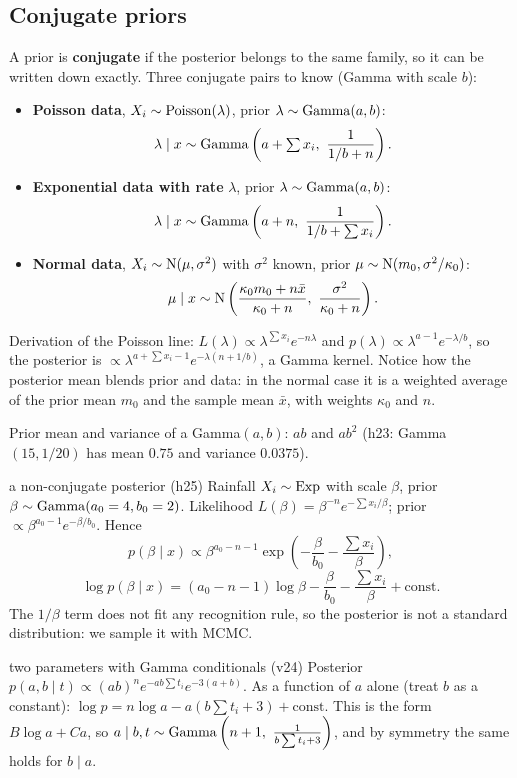 \subsection{Conjugate priors}
A prior is \textbf{conjugate} if the posterior belongs to the same family, so it can be written down exactly.
Three conjugate pairs to know (Gamma with scale $b$):
\begin{itemize}
  \item \textbf{Poisson data}, $X_i\sim\mathrm{Poisson}(\lambda)$, prior $\lambda\sim\mathrm{Gamma}(a,b)$:
  \[ \lambda\mid x\sim\Gam\left(a+\textstyle\sum x_i,\ \dfrac1{1/b+n}\right). \]
  \item \textbf{Exponential data with rate} $\lambda$, prior $\lambda\sim\mathrm{Gamma}(a,b)$:
  \[ \lambda\mid x\sim\Gam\left(a+n,\ \dfrac{1}{1/b+\sum x_i}\right). \]
  \item \textbf{Normal data}, $X_i\sim\mathrm{N}(\mu,\sigma^2)$ with $\sigma^2$ known, prior $\mu\sim\mathrm{N}(m_0,\sigma^2/\kappa_0)$:
  \[ \mu\mid x\sim\mathrm{N}\left(\frac{\kappa_0m_0+n\bar x}{\kappa_0+n},\ \frac{\sigma^2}{\kappa_0+n}\right). \]
\end{itemize}
Derivation of the Poisson line: $L(\lambda)\propto\lambda^{\sum x_i}e^{-n\lambda}$ and $p(\lambda)\propto\lambda^{a-1}e^{-\lambda/b}$, so the posterior is $\propto\lambda^{a+\sum x_i-1}e^{-\lambda(n+1/b)}$, a Gamma kernel. Notice how the posterior mean blends prior and data: in the normal case it is a weighted average of the prior mean $m_0$ and the sample mean $\bar x$, with weights $\kappa_0$ and $n$.

Prior mean and variance of a Gamma$(a,b)$: $ab$ and $ab^2$ (h23: Gamma$(15,1/20)$ has mean $0.75$ and variance $0.0375$).

\begin{example}{a non-conjugate posterior (h25)}
Rainfall $X_i\sim\mathrm{Exp}$ with scale $\beta$, prior $\beta\sim\mathrm{Gamma}(a_0=4,b_0=2)$.
Likelihood $L(\beta) = \beta^{-n}e^{-\sum x_i/\beta}$; prior $\propto\beta^{a_0-1}e^{-\beta/b_0}$. Hence
\[
p(\beta\mid x)\propto\beta^{a_0-n-1}\exp\left(-\frac{\beta}{b_0}-\frac{\sum x_i}{\beta}\right),
\]
\[
\log p(\beta\mid x) = (a_0-n-1)\log\beta-\frac{\beta}{b_0}-\frac{\sum x_i}{\beta}+\text{const}.
\]
The $1/\beta$ term does not fit any recognition rule, so the posterior is not a standard distribution: we sample it with MCMC.
\end{example}

\begin{example}{two parameters with Gamma conditionals (v24)}
Posterior $p(a,b\mid t)\propto(ab)^ne^{-ab\sum t_i}e^{-3(a+b)}$. As a function of $a$ alone (treat $b$ as a constant):
$\log p = n\log a - a\left(b\sum t_i+3\right)+\text{const}$. This is the form $B\log a + Ca$, so
$a\mid b,t\sim\Gam\left(n+1,\ \frac{1}{b\sum t_i+3}\right)$, and by symmetry the same holds for $b\mid a$.
\end{example}

